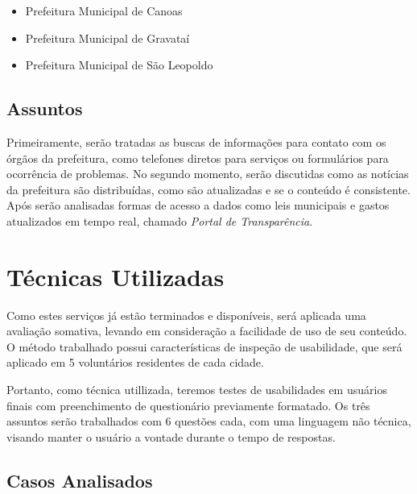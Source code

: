 \documentclass{article}
\begin{document}
\begin{itemize}
  \item Prefeitura Municipal de Canoas
  \item Prefeitura Municipal de Gravataí
  \item Prefeitura Municipal de São Leopoldo
\end{itemize}

\subsection{Assuntos}

Primeiramente, serão tratadas as buscas de informações para contato com os
órgãos da prefeitura, como telefones diretos para serviços ou formulários para
ocorrência de problemas. No segundo momento, serão discutidas como as notícias
da prefeitura são distribuídas, como são atualizadas e se o conteúdo é
consistente. Após serão analisadas formas de acesso a dados como leis municipais
e gastos atualizados em tempo real, chamado \textit{Portal de Transparência}.

\section{Técnicas Utilizadas}

Como estes serviços já estão terminados e disponíveis, será aplicada uma
avaliação somativa, levando em consideração a facilidade de uso de seu conteúdo.
O método trabalhado possui características de inspeção de usabilidade, que será
aplicado em 5 voluntários residentes de cada cidade.

Portanto, como técnica utillizada, teremos testes de usabilidades em usuários
finais com preenchimento de questionário previamente formatado. Os três assuntos
serão trabalhados com 6 questões cada, com uma linguagem não técnica, visando
manter o usuário a vontade durante o tempo de respostas.

\subsection{Casos Analisados}
\end{document}
